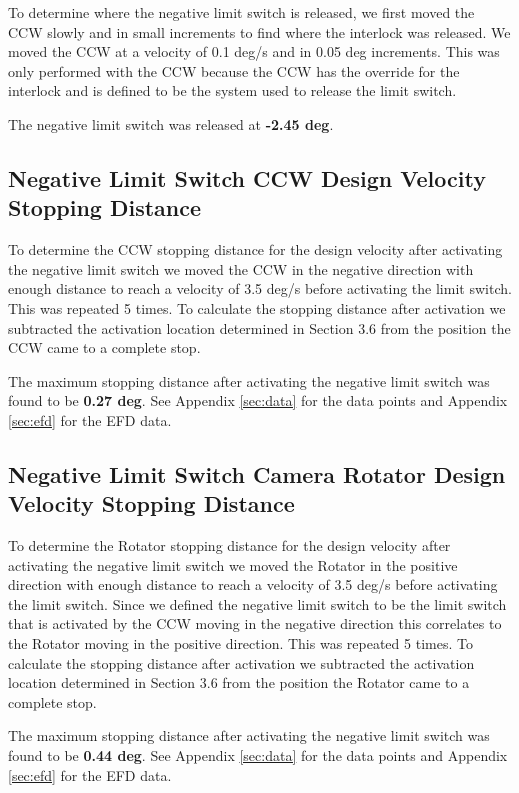 \documentclass[SE,lsstdraft,authoryear,toc]{lsstdoc}
\begin{document}
To determine where the negative limit switch is released, we first moved
the CCW slowly and in small increments to find where the interlock was
released. We moved the CCW at a velocity of 0.1 deg/s and in 0.05 deg
increments. This was only performed with the CCW because the CCW has the
override for the interlock and is defined to be the system used to
release the limit switch.

The negative limit switch was released at \textbf{-2.45 deg}.

\subsection{Negative Limit Switch CCW Design Velocity Stopping Distance}

To determine the CCW stopping distance for the design velocity after
activating the negative limit switch we moved the CCW in the negative
direction with enough distance to reach a velocity of 3.5 deg/s before
activating the limit switch. This was repeated 5 times. To
calculate the stopping distance after activation we subtracted the
activation location determined in Section 3.6 from the position the CCW
came to a complete stop.

The maximum stopping distance after activating the negative limit switch
was found to be \textbf{0.27 deg}. See Appendix \ref{sec:data} for the data points
and Appendix \ref{sec:efd} for the EFD data.

\subsection{Negative Limit Switch Camera Rotator Design Velocity Stopping Distance}

To determine the Rotator stopping distance for the design velocity after
activating the negative limit switch we moved the Rotator in the
positive direction with enough distance to reach a velocity of 3.5 deg/s
before activating the limit switch. Since we defined the negative limit
switch to be the limit switch that is activated by the CCW moving in the
negative direction this correlates to the Rotator moving in the positive
direction. This was repeated 5 times. To calculate the stopping
distance after activation we subtracted the activation location
determined in Section 3.6 from the position the Rotator came to a
complete stop.

The maximum stopping distance after activating the negative limit switch
was found to be \textbf{0.44 deg}. See Appendix \ref{sec:data} for the data points
and Appendix \ref{sec:efd} for the EFD data.
\end{document}
